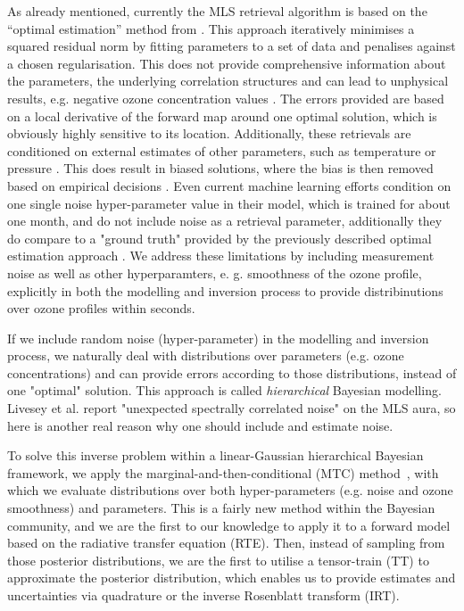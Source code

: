 As already mentioned, currently the MLS retrieval algorithm \cite{livesey2006retrieval} is based on the “optimal estimation” method from \cite{rodgers1976retrieval}.
This approach iteratively minimises a squared residual norm by fitting parameters to a set of data and penalises against a chosen regularisation.
This does not provide comprehensive information about the parameters, the underlying correlation structures and can lead to unphysical results, e.g. negative ozone concentration values \cite{MLSdata}.
The errors provided are based on a local derivative of the forward map around one optimal solution, which is obviously highly sensitive to its location.
Additionally, these retrievals are conditioned on external estimates of other parameters, such as temperature or pressure \cite{livesey2006retrieval}.
This does result in biased solutions, where the bias is then removed based on empirical decisions \cite{livesey2008ozonecarbonmono, Froidevaux2008snrozone}.
Even current machine learning efforts condition on one single noise hyper-parameter value in their model, which is trained for about one month, and do not include noise as a retrieval parameter, additionally they do compare to a "ground truth" provided by the previously described optimal estimation approach \cite{werner2023machlearn, bojkov2008NeuralNet}.
We address these limitations by including measurement noise as well as other hyperparamters, e. g. smoothness of the ozone profile, explicitly in both the modelling and inversion process to provide distribinutions over ozone profiles within seconds.

If we include random noise (hyper-parameter) in the modelling and inversion process, we naturally deal with distributions over parameters (e.g. ozone concentrations) and can provide errors according to those distributions, instead of one "optimal" solution.
This approach is called \textit{hierarchical} Bayesian modelling.
Livesey et al. \cite{livesey2006retrieval} report "unexpected spectrally correlated noise" on the MLS aura, so here is another real reason why one should include and estimate noise.

To solve this inverse problem within a linear-Gaussian hierarchical Bayesian framework, we apply the marginal-and-then-conditional (MTC) method~\cite{fox2016fast}, with which we evaluate distributions over both hyper-parameters (e.g. noise and ozone smoothness) and parameters.
This is a fairly new method within the Bayesian community, and we are the first to our knowledge to apply it to a forward model based on the radiative transfer equation (RTE).
Then, instead of sampling from those posterior distributions, we are the first to utilise a tensor-train (TT) to approximate the posterior distribution, which enables us to provide estimates and uncertainties via quadrature or the inverse Rosenblatt transform (IRT).

